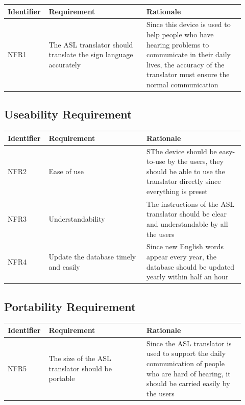\documentclass[12pt]{article}
\begin{document}
\renewcommand{\arraystretch}{1.2}
\noindent \begin{tabularx}{\textwidth}{p{0.12\linewidth}|p{0.4\linewidth}|p{0.4\linewidth}}
\toprule
\textbf{Identifier} & \textbf{Requirement} & \textbf{Rationale}\\
\midrule
NFR1
& The ASL translator should translate the sign language accurately 
& Since this device is used to help people who have hearing problems to communicate in their daily lives, the accuracy of the translator must ensure the normal communication\\
\bottomrule
\end{tabularx}

\subsection{Useability Requirement}

\renewcommand{\arraystretch}{1.2}
\noindent \begin{tabularx}{\textwidth}{p{0.12\linewidth}|p{0.4\linewidth}|p{0.4\linewidth}}
\toprule
\textbf{Identifier} & \textbf{Requirement} & \textbf{Rationale}\\
\midrule
NFR2
& Ease of use 
& SThe device should be easy-to-use by the users, they should be able to use the translator directly since everything is preset\\
\hline
NFR3
& Understandability
& The instructions of the ASL translator should be clear and understandable by all the users\\
\hline
NFR4
& Update the database timely and easily
& Since new English words appear every year, the database should be updated yearly within half an hour\\
\bottomrule
\end{tabularx}

\subsection{Portability Requirement}

\renewcommand{\arraystretch}{1.2}
\noindent \begin{tabularx}{\textwidth}{p{0.12\linewidth}|p{0.4\linewidth}|p{0.4\linewidth}}
\toprule
\textbf{Identifier} & \textbf{Requirement} & \textbf{Rationale}\\
\midrule
NFR5
& The size of the ASL translator should be portable
& Since the ASL translator is used to support the daily communication of people who are hard of hearing, it should be carried easily by the users\\
\bottomrule
\end{tabularx}
\end{document}
